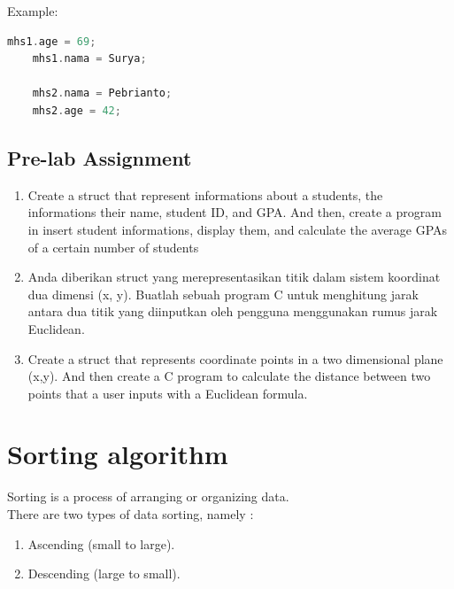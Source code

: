 Example:
\begin{lstlisting}[language=c]
    mhs1.age = 69;
    mhs1.nama = Surya;
    
    mhs2.nama = Pebrianto;
    mhs2.age = 42;
\end{lstlisting}

\subsection{Pre-lab Assignment}
\begin{enumerate}
    \item Create a struct that represent informations about a students, the informations their name, student ID, and GPA.
          And then, create a program in insert student informations, display them, and calculate the average GPAs of a
          certain number of students
    \item Anda diberikan struct yang merepresentasikan titik dalam sistem koordinat dua dimensi (x, y).
          Buatlah sebuah program C untuk menghitung jarak antara dua titik yang diinputkan oleh pengguna menggunakan rumus jarak Euclidean.
    \item Create a struct that represents coordinate points in a two dimensional plane (x,y). And then create a C program to calculate
          the distance between two points that a user inputs with a Euclidean formula.
\end{enumerate}

\section{Sorting algorithm}
Sorting is a process of arranging or organizing data.\\
There are two types of data sorting, namely :
\begin{enumerate}
    \item Ascending (small to large).
    \item Descending (large to small).
\end{enumerate}

